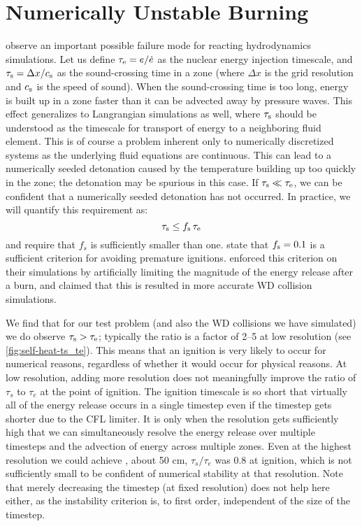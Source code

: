 \documentclass[twocolumn,numberedappendix,trackchanges]{../aastex62}
\begin{document}
\section{Numerically Unstable Burning}
\label{sec:unstable_burning}

\citet{kushnir:2013} observe an important possible failure mode
for reacting hydrodynamics simulations. Let us define $\tau_{\rm e} = e / \dot{e}$
as the nuclear energy injection timescale, and $\tau_{\rm s} = \Delta x / c_{\rm s}$
as the sound-crossing time in a zone (where $\Delta x$ is the grid
resolution and $c_{\rm s}$ is the speed of sound). When the sound-crossing
time is too long, energy is built up in a zone faster than it can be
advected away by pressure waves. This effect generalizes to
Langrangian simulations as well, where $\tau_{\rm s}$ should be understood
as the timescale for transport of energy to a neighboring fluid element.
This is of course a problem inherent 
only to numerically discretized systems as the underlying fluid equations
are continuous. This can lead to a numerically seeded detonation
caused by the temperature building up too quickly in the zone; the
detonation may be spurious in this case. If $\tau_{\rm s} \ll \tau_{\rm e}$,
we can be confident that a numerically seeded detonation has not
occurred. In practice, we will quantify this requirement as:
\begin{equation}
  \tau_{\rm s} \leq f_{\rm s}\, \tau_{\rm e} \label{eq:burning_limiter}
\end{equation}
and require that $f_{s}$ is sufficiently smaller than one.
\citet{kushnir:2013} state that $f_{\rm s} = 0.1$ is a sufficient
criterion for avoiding premature ignitions. \citeauthor{kushnir:2013}
enforced this criterion on their simulations by artificially limiting
the magnitude of the energy release after a burn, and claimed that
this is resulted in more accurate WD collision simulations.

We find that for our test problem (and also the WD collisions we have simulated)
we do observe $\tau_{\rm s} > \tau_{\rm e}$; typically the ratio is a factor of 2--5 at
low resolution (see \autoref{fig:self-heat-ts_te}). This means that an ignition is
very likely to occur for numerical reasons, regardless of whether it would occur for physical reasons.
At low resolution, adding more resolution does not meaningfully improve the ratio of
$\tau_s$ to $\tau_e$ at the point of ignition. The ignition timescale is so short
that virtually all of the energy release occurs in a single timestep even if the
timestep gets shorter due to the CFL limiter. It is only when the resolution gets
sufficiently high that we can simultaneously resolve the energy release over multiple
timesteps and the advection of energy across multiple zones. Even at the highest resolution
we could achieve , about 50 cm, $\tau_s / \tau_e$ was 0.8 at ignition, which is not
sufficiently small to be confident of numerical stability at that resolution. Note
that merely decreasing the timestep (at fixed resolution) does not help here either, as the
instability criterion is, to first order, independent of the size of the timestep.
\end{document}
